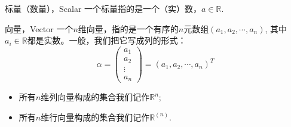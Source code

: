 \begin{frame}

\begin{block}{标量（数量），Scalar}
一个标量指的是一个（实）数，$a\in\mathbb{R}$.
\end{block}

\begin{block}{向量，Vector}
一个$n$维向量，指的是一个有序的$n$元数组$(a_1,a_2,\cdots,a_n)$, 其中$a_i\in\mathbb{R}$都是实数。一般，我们把它写成列的形式：
\[\alpha = \begin{pmatrix}
a_1 \\ a_2 \\ \vdots \\ a_n
\end{pmatrix} = (a_1,a_2,\cdots,a_n)^T\]

\pause

\begin{itemize}
\item 所有$n$维列向量构成的集合我们记作$\mathbb{R}^n$;
\item 所有$n$维行向量构成的集合我们记作$\mathbb{R}^{(n)}$.
\end{itemize}
\end{block}

\end{frame}


